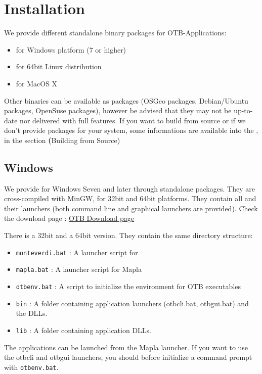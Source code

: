 \section{Installation}\label{sec:appinstall}

We provide different standalone binary packages for OTB-Applications:
\begin{itemize}
\item for Windows platform (7 or higher)
\item for 64bit Linux distribution
\item for MacOS X
\end{itemize}

Other binaries can be available as packages (OSGeo packages, Debian/Ubuntu packages,
OpenSuse packages), however be advised that they may not be up-to-date nor delivered
with full features.
If you want to build from source or if we don't provide packages for your system,
some informations are available into the \sg, in the section \textbf(Building from Source)

\subsection{Windows}

We provide \app for Windows Seven and later through standalone packages.
They are cross-compiled with MinGW, for 32bit and 64bit platforms.
They contain all \app and their launchers (both command line and graphical
launchers are provided). Check the download page :
\href{https://www.orfeo-toolbox.org/download}{OTB Download page}

There is a 32bit and a 64bit version. They contain the same directory structure:
\begin{itemize}
\item \verb?monteverdi.bat? : A launcher script for \mont
\item \verb?mapla.bat? : A launcher script for Mapla
\item \verb?otbenv.bat? : A script to initialize the environment for OTB executables
\item \verb?bin? : A folder containing application launchers (otbcli\textunderscore *.bat,
otbgui\textunderscore *.bat) and the DLLs.
\item \verb?lib? : A folder containing application DLLs.
\end{itemize}

The applications can be launched from the Mapla launcher. If you want to use
the otbcli and otbgui launchers, you should before initialize a command prompt
with \verb?otbenv.bat?.

